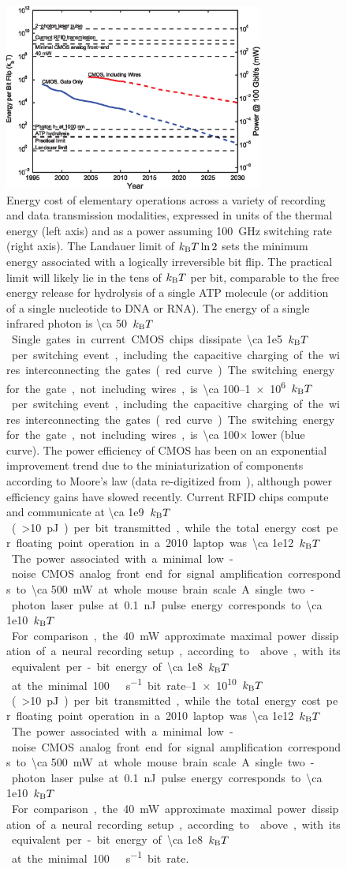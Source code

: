 \begin{figure}[htbp]
\caption{
Energy cost of elementary operations across a variety of recording and data transmission modalities, expressed in units of the thermal energy (left axis) and as a power assuming \SI{100}{\giga\hertz} switching rate (right axis). The Landauer limit of $k_{\text{\scriptsize B}} T \ln 2$ sets the minimum energy associated with a logically irreversible bit flip. The practical limit will likely lie in the tens of $k_{\text{\scriptsize B}} T$ per bit, comparable to the free energy release for hydrolysis of a single ATP molecule (or addition of a single nucleotide to DNA or RNA). The energy of a single infrared photon is \SI{\ca 50}{$k_{\text{\scriptsize B}} T$}. Single gates in current CMOS chips dissipate \SIrange{\ca 1e5}{1e6}{$k_{\text{\scriptsize B}} T$} per switching event, including the capacitive charging of the wires interconnecting the gates (red curve). The switching energy for the gate, not including wires, is \num{\ca 100}$\times$ lower (blue curve). The power efficiency of CMOS has been on an exponential improvement trend due to the miniaturization of components according to Moore's law (data re-digitized from~\cite{tucker11}), although power efficiency gains have slowed recently. Current RFID chips compute and communicate at \SIrange{\ca 1e9}{1e10}{$k_{\text{\scriptsize B}} T$} (\SI{>10}{\pico\joule}) per bit transmitted, while the total energy cost per floating point operation in a 2010 laptop was \SI{\ca 1e12}{$k_{\text{\scriptsize B}} T$}. The power associated with a minimal low-noise CMOS analog front end for signal amplification corresponds to \SI{\ca 500}{\milli\watt} at whole mouse brain scale. A single two-photon laser pulse at \SI{0.1}{\nano\joule} pulse energy corresponds to \SI{\ca 1e10}{$k_{\text{\scriptsize B}} T$}. For comparison, the \SI{40}{\milli\watt} approximate maximal power dissipation of a neural recording setup, according to  above, with its equivalent per-bit energy of \SI{\ca 1e8}{$k_{\text{\scriptsize B}} T$} at the minimal \SI{100}{\giga\bit\per\second} bit rate.
}
\label{fig:cmos}
\centering
\includegraphics[width=0.76\textwidth]{figs/Fig4.eps}
\end{figure}

